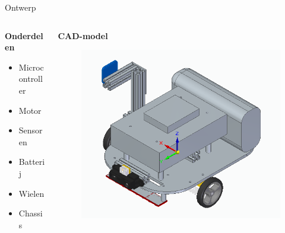 \documentclass[aspectratio=169,kulak,t,handout]{kulakbeamer} %
\begin{document}
\begin{frame}{Ontwerp}
	\begin{columns}
		\begin{column}{0.47\textwidth}\centering
			{\bf{Onderdelen}}\\[.2cm]
			\begin{itemize}
				\item Microcontroller
				\item Motor
				\item Sensoren
				\item Batterij
				\item Wielen
				\item Chassis
			\end{itemize}
		\end{column}
		\begin{column}{0.75\textwidth}\centering
		{\bf{CAD-model}}\\[.2cm]
			\begin{figure}
				\centering
				\includegraphics[width=.60\textwidth]{afbchassis}
				
				\label{fig:CAD-model}
			\end{figure}
		\end{column}
	\end{columns}
\end{frame}
\end{document}
